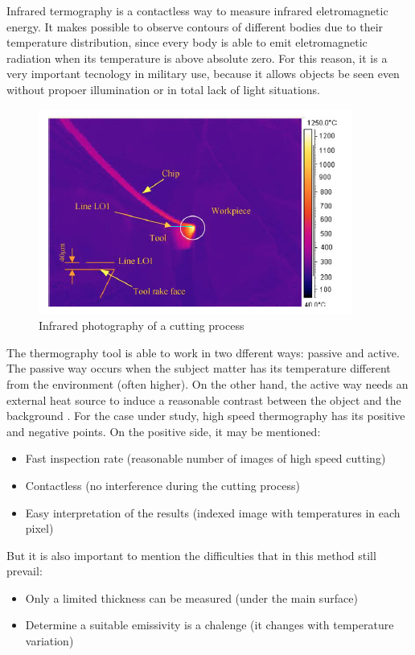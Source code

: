 	Infrared termography is a contactless way to measure infrared eletromagnetic energy. It makes possible to observe contours of different bodies due to their temperature distribution, since every body is able to emit eletromagnetic radiation when its temperature is above absolute zero. For this reason, it is a very important tecnology in military use, because it allows objects be seen even without propoer illumination or in total lack of light situations.

	\begin{figure}[H]
		\centering
		\captionsetup{justification=centering}
		\includegraphics[scale=0.75]{Cap2/InfraRed/exinfrared.png}
		\caption{Infrared photography of a cutting process \cite{abukhshim2006heat}}
		\label{fig:exinfrared}
	\end{figure}

	The thermography tool is able to work in two dfferent ways: passive and active. The passive way occurs when the subject matter has its temperature different from the environment (often higher). On the other hand, the active way needs an external heat source to induce a reasonable contrast between the object and the background \cite {maldague2000}.
	For the case under study, high speed thermography has its positive and negative points. On the positive side, it may be mentioned:
	\begin{itemize}
		\item Fast inspection rate (reasonable number of images of high speed cutting)
		\item Contactless (no interference during the cutting process)
		\item Easy interpretation of the results (indexed image with temperatures in each pixel)
	\end{itemize}
	But it is also important to mention the difficulties that in this method still prevail:
	\begin{itemize}
		\item Only a limited thickness can be measured (under the main surface)
		\item Determine a suitable emissivity is a chalenge (it changes with temperature variation)
	\end{itemize}